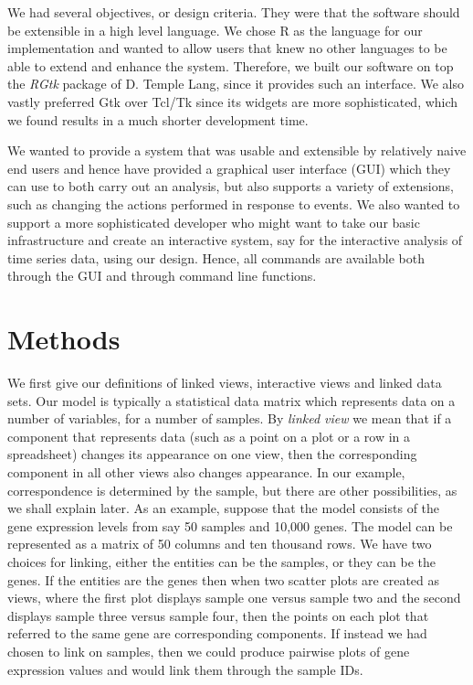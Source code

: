 \documentclass[11pt]{article}
\newcommand{\Rpackage}[1]{{\textit{#1}}}
\begin{document}
We had several objectives, or design criteria. They were that the
software should be extensible in a high level language. We chose R as
the language for our implementation and wanted to allow users that
knew no other languages to be able to extend and enhance the
system. Therefore, we built our software on top the \Rpackage{RGtk} package of
D. Temple Lang, since it provides such an interface. We also vastly
preferred Gtk over Tcl/Tk since its widgets are more sophisticated,
which we found results in a much shorter development time.

We wanted to provide a system that was usable and extensible by
relatively naive end users and hence have provided a graphical user
interface (GUI) which they can use to both carry out an analysis, but
also supports a variety of extensions, such as changing the actions
performed in response to events. We also wanted to support a more
sophisticated developer who might want to take our basic infrastructure
and create an interactive system, say for the interactive analysis of
time series data, using our design. Hence, all commands are
available both through the GUI and through command line functions.

\section{Methods}

We first give our definitions of linked views, interactive views and
linked data sets.  Our model is typically a statistical data
matrix which represents data on a number of variables, for a
number of samples.  By \textit{linked view} we mean that if a
component that represents data (such as a point on a plot or a row in
a spreadsheet) changes its appearance on one view, then the
corresponding component in all other views also changes appearance.
In our example, correspondence is determined by the sample,
but there are other possibilities, as we shall explain later.  As an
example, suppose that the model consists of the gene expression levels
from say 50 samples and 10,000 genes.  The model can be represented as
a matrix of 50 columns and ten thousand rows.  We have two choices for
linking, either the entities can be the samples, or they can be the
genes. If the entities are the genes then when two scatter plots are
created as views, where the first plot displays sample one versus sample two 
and the second displays sample three versus sample four, then the points
on each plot that referred to the same gene are corresponding
components.  If instead we had chosen to link on samples, then we
could produce pairwise plots of gene expression values and would link
them through the sample IDs.
\end{document}

